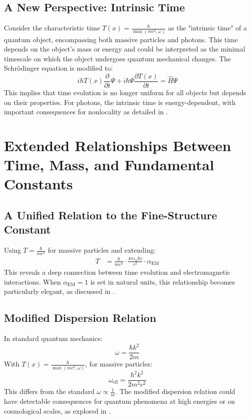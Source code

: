\documentclass[12pt,a4paper]{article}
\newcommand{\Tfield}{T(x)}
\newcommand{\alphaEM}{\alpha_{\text{EM}}}
\begin{document}
	\subsection{A New Perspective: Intrinsic Time}
	Consider the characteristic time \( \Tfield = \frac{\hbar}{\max(m c^2, \omega)} \) as the "intrinsic time" of a quantum object, encompassing both massive particles and photons. This time depends on the object's mass or energy and could be interpreted as the minimal timescale on which the object undergoes quantum mechanical changes. The Schrödinger equation is modified to:
	\begin{equation}
		i\hbar \Tfield \frac{\partial}{\partial t} \Psi + i\hbar \Psi \frac{\partial \Tfield}{\partial t} = \hat{H} \Psi
	\end{equation}
	This implies that time evolution is no longer uniform for all objects but depends on their properties. For photons, the intrinsic time is energy-dependent, with important consequences for nonlocality as detailed in \cite{pascher_photons_2025}.
	
	\section{Extended Relationships Between Time, Mass, and Fundamental Constants}
	\subsection{A Unified Relation to the Fine-Structure Constant}
	Using \( T = \frac{\hbar}{mc^2} \) for massive particles and extending:
	\begin{align}
		T &= \frac{\hbar}{mc^2} \cdot \frac{4\pi\varepsilon_0\hbar c}{e^2} \cdot \alphaEM
	\end{align}
	This reveals a deep connection between time evolution and electromagnetic interactions. When \(\alphaEM = 1\) is set in natural units, this relationship becomes particularly elegant, as discussed in \cite{pascher_alphabeta_2025}.
	
	\subsection{Modified Dispersion Relation}
	In standard quantum mechanics:
	\begin{equation}
		\omega = \frac{\hbar k^2}{2m}
	\end{equation}
	With \( \Tfield = \frac{\hbar}{\max(m c^2, \omega)} \), for massive particles:
	\begin{equation}
		\omega_{\text{eff}} = \frac{\hbar^2 k^2}{2 m^2 c^2}
	\end{equation}
	This differs from the standard \( \omega \propto \frac{1}{m} \). The modified dispersion relation could have detectable consequences for quantum phenomena at high energies or on cosmological scales, as explored in \cite{pascher_emergente_gravitation_2025}.
	
\end{document}
